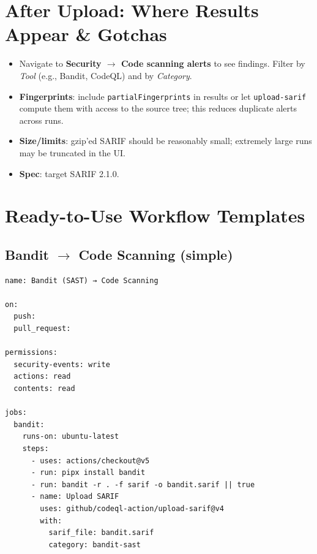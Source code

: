 \documentclass[11pt,a4paper]{article}
\providecommand{\term}[1]{\texttt{#1}}
\begin{document}
\section{After Upload: Where Results Appear \& Gotchas}
\begin{itemize}
  \item Navigate to \textbf{Security $\rightarrow$ Code scanning alerts} to see findings. Filter by \emph{Tool} (e.g., Bandit, CodeQL) and by \emph{Category}.
  \item \textbf{Fingerprints}: include \term{partialFingerprints} in results or let \term{upload-sarif} compute them with access to the source tree; this reduces duplicate alerts across runs.
  \item \textbf{Size/limits}: gzip'ed SARIF should be reasonably small; extremely large runs may be truncated in the UI.
  \item \textbf{Spec}: target SARIF 2.1.0.
\end{itemize}
\clearpage

\section{Ready-to-Use Workflow Templates}
\subsection{\texorpdfstring{Bandit $\rightarrow$ Code Scanning (simple)}{Bandit to Code Scanning (simple)}}
\begin{verbatim}
name: Bandit (SAST) → Code Scanning

on:
  push:
  pull_request:

permissions:
  security-events: write
  actions: read
  contents: read

jobs:
  bandit:
    runs-on: ubuntu-latest
    steps:
      - uses: actions/checkout@v5
      - run: pipx install bandit
      - run: bandit -r . -f sarif -o bandit.sarif || true
      - name: Upload SARIF
        uses: github/codeql-action/upload-sarif@v4
        with:
          sarif_file: bandit.sarif
          category: bandit-sast
\end{verbatim}
\clearpage
\end{document}
